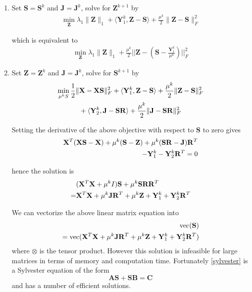 \documentclass{article}
\begin{document}
\begin{enumerate}

 \item Set $\mathbf S = \mathbf S^k$ and $\mathbf J = \mathbf J^k$, solve for $\mathbf Z^{k+1}$ by
\begin{align*}
 \min_{\mathbf Z} \lambda_1 \|\mathbf Z\|_{1} + \langle \mathbf Y^k_1, \mathbf Z - \mathbf S\rangle + \frac{\mu^k}2\|\mathbf Z - \mathbf S\|^2_F
\end{align*}

which is equivalent to
\begin{align}
\min_{\mathbf Z} \lambda_1 \|\mathbf Z\|_{1} + \frac{\mu^k}{2}||\mathbf Z - (\mathbf S - \frac{\mathbf Y^k_1}{\mu^k})||^2_F
\label{ForZ}
\end{align}

\item Set $\mathbf Z = \mathbf Z^k$ and $\mathbf J = \mathbf J^k$, solve for $\mathbf S^{k+1}$ by
\begin{align*}
 \min_{\mathbf\mu^k S} \frac12\|&\mathbf X -  \mathbf X\mathbf S\|^2_F + \langle \mathbf Y^k_1, \mathbf Z - \mathbf S\rangle +\frac{\mu^k}2\|\mathbf Z - \mathbf S\|^2_F \notag\\
&+ \langle \mathbf Y^k_2, \mathbf J - \mathbf S\mathbf R\rangle +\frac{\mu^k}2\|\mathbf J - \mathbf S\mathbf R\|^2_F
\end{align*}

Setting the derivative of the above objective with respect to $\mathbf S$ to zero gives
\begin{align}
 \mathbf X^T(\mathbf X\mathbf S - \mathbf X) + \mu^k (\mathbf S - \mathbf Z) + \mu^k(\mathbf S\mathbf R - \mathbf J)\mathbf R^T \notag\\
 - \mathbf Y^k_1 - \mathbf Y^k_2\mathbf R^T = 0
\end{align}
 
hence the solution is
\begin{align}
\label{sylvester}
 &(\mathbf X^T\mathbf X +\mu^k I) \mathbf S + \mu^k \mathbf S \mathbf R\mathbf R^T \\
 =& \mathbf X^T\mathbf X+ \mu^k\mathbf J \mathbf R^T + \mu^k \mathbf Z + \mathbf Y^k_1 + \mathbf Y^k_2\mathbf R^T \notag
\end{align}
 
We can vectorize the above linear matrix equation into
\begin{align*}
 [I\otimes (\mathbf X^T\mathbf X + \mu^k I) + \mu^k\mathbf R\mathbf R^T\otimes I]\textrm{vec}(\mathbf S) \notag\\
 = \textrm{vec}(\mathbf X^T\mathbf X+ \mu^k \mathbf J \mathbf R^T + \mu^k \mathbf Z + \mathbf Y^k_1 + \mathbf Y^k_2\mathbf R^T)
\end{align*}
where $\otimes$ is the tensor product. However this solution is infeasible for large matrices in terms of memory and computation time. Fortunately \eqref{sylvester} is a Sylvester equation of the form
\[
\mathbf{A S + S B = C}
\]
and has a number of efficient solutions.


\end{enumerate}
\end{document}
